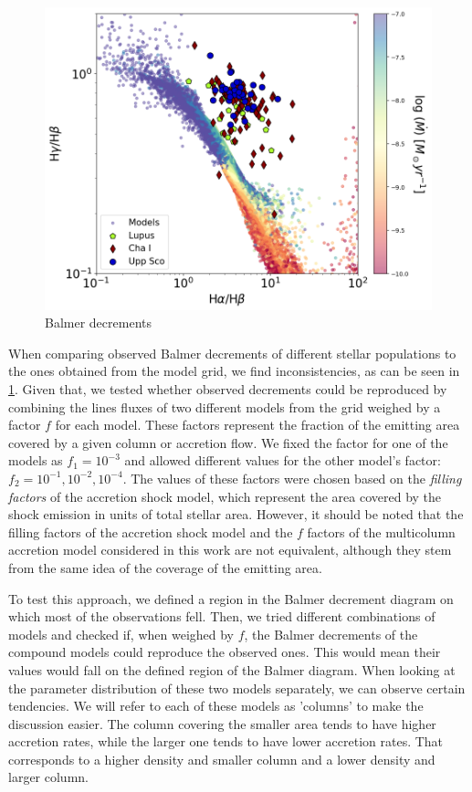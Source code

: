\documentclass[twocolumn,linenumbers]{aastex631}
\begin{document}
\begin{figure}
    \centering
    \includegraphics[width=0.8\linewidth]{figures/BalmerDecrements.png}
    \caption{Balmer decrements}
    \label{fig:balmer_decrement}
\end{figure}

When comparing observed Balmer decrements of different stellar populations to the ones obtained from the model grid, we find inconsistencies, as can be seen in \ref{fig:balmer_decrement}. Given that, we tested whether observed decrements could be reproduced by combining the lines fluxes of two different models from the grid weighed by a factor $f$ for each model. These factors represent the fraction of the emitting area covered by a given column or accretion flow. We fixed the factor for one of the models as $f_1=10^{-3}$ and allowed different values for the other model's factor: $f_2 = 10^{-1},10^{-2},10^{-4}$. The values of these factors were chosen based on the \textit{filling factors} of the accretion shock model, which represent the area covered by the shock emission in units of total stellar area. However, it should be noted that the filling factors of the accretion shock model and the $f$ factors of the multicolumn accretion model considered in this work are not equivalent, although they stem from the same idea of the coverage of the emitting area. 

To test this approach, we defined a region in the Balmer decrement diagram on which most of the observations fell. Then, we tried different combinations of models and checked if, when weighed by $f$, the Balmer decrements of the compound models could reproduce the observed ones. This would mean their values would fall on the defined region of the Balmer diagram. When looking at the parameter distribution of these two models separately, we can observe certain tendencies. We will refer to each of these models as 'columns' to make the discussion easier. The column covering the smaller area tends to have higher accretion rates, while the larger one tends to have lower accretion rates. That corresponds to a higher density and smaller column and a lower density and larger column.
\end{document}
